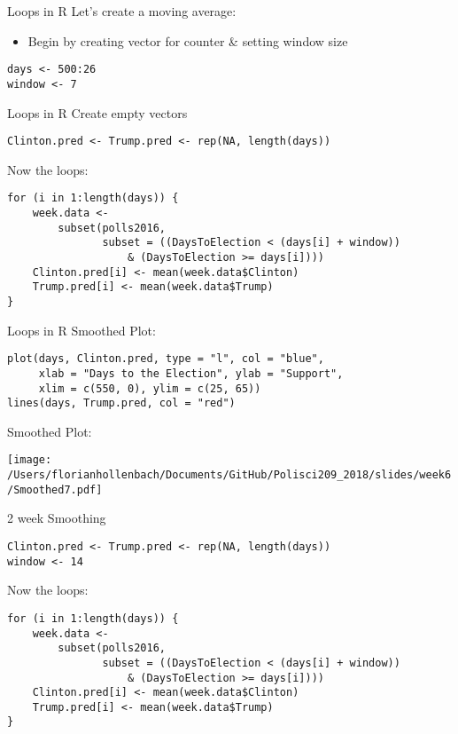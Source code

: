 \documentclass[presentation]{beamer}
\begin{document}
\begin{frame}[fragile,label={sec:orgb11ddfe}]{Loops in R}
 Let's create a moving average:

\begin{itemize}
\item Begin by creating vector for counter \& setting window size
\end{itemize}

\begin{verbatim}
days <- 500:26
window <- 7
\end{verbatim}
\end{frame}


\begin{frame}[fragile,shrink=25,label={sec:org5ebd056}]{Loops in R}
 Create empty vectors

\begin{verbatim}
Clinton.pred <- Trump.pred <- rep(NA, length(days))
\end{verbatim}
\pause


Now the loops:
\begin{verbatim}
for (i in 1:length(days)) {
    week.data <-
        subset(polls2016,
               subset = ((DaysToElection < (days[i] + window))
                   & (DaysToElection >= days[i])))
    Clinton.pred[i] <- mean(week.data$Clinton)
    Trump.pred[i] <- mean(week.data$Trump)
}
\end{verbatim}
\end{frame}

\begin{frame}[fragile,label={sec:orga1510c4}]{Loops in R}
 Smoothed Plot:
\begin{verbatim}
plot(days, Clinton.pred, type = "l", col = "blue",
     xlab = "Days to the Election", ylab = "Support",
     xlim = c(550, 0), ylim = c(25, 65))
lines(days, Trump.pred, col = "red")
\end{verbatim}
\end{frame}


\begin{frame}[label={sec:org94cd965}]{Smoothed Plot:}
\begin{center}
\texttt{[image: /Users/florianhollenbach/Documents/GitHub/Polisci209\_2018/slides/week6/Smoothed7.pdf]}
\end{center}
\end{frame}



\begin{frame}[fragile,shrink=25,label={sec:org17fbbc6}]{2 week Smoothing}
 \begin{verbatim}
Clinton.pred <- Trump.pred <- rep(NA, length(days))
window <- 14

\end{verbatim}
\pause


Now the loops:
\begin{verbatim}
for (i in 1:length(days)) {
    week.data <-
        subset(polls2016,
               subset = ((DaysToElection < (days[i] + window))
                   & (DaysToElection >= days[i])))
    Clinton.pred[i] <- mean(week.data$Clinton)
    Trump.pred[i] <- mean(week.data$Trump)
}
\end{verbatim}
\end{frame}
\end{document}

